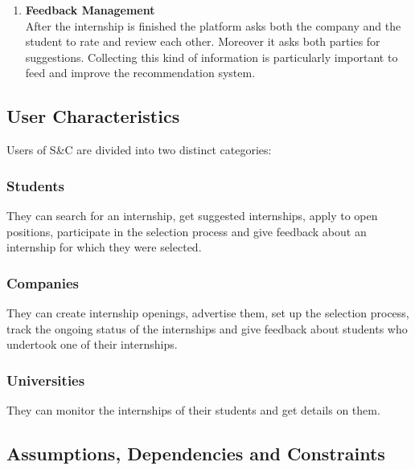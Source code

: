 \begin{enumerate}
        \item \textbf {Feedback Management}
        \\ After the internship is finished the platform asks both the company and the student to rate and review each other. Moreover it asks both parties for suggestions. Collecting this kind of information is particularly important to feed and improve the recommendation system.
    \end{enumerate}



\subsection{User Characteristics}
    Users of S\&C are divided into two distinct categories:



\subsubsection{Students}
    They can search for an internship, get suggested internships, apply to open positions, participate in the selection process and give feedback about an internship for which they were selected.



\subsubsection{Companies}
    They can create internship openings, advertise them, set up the selection process, track the ongoing status of the internships and give feedback about students who undertook one of their internships.


\subsubsection{Universities}
    They can monitor the internships of their students and get details on them.
\subsection{Assumptions, Dependencies and Constraints}



